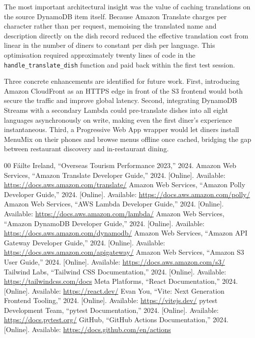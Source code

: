 \documentclass[conference]{IEEEtran}
\begin{document}
The most important architectural insight was the value of caching translations on the source DynamoDB item itself. Because Amazon Translate charges per character rather than per request, memoising the translated name and description directly on the dish record reduced the effective translation cost from linear in the number of diners to constant per dish per language. This optimisation required approximately twenty lines of code in the \texttt{handle\_translate\_dish} function and paid back within the first test session.

Three concrete enhancements are identified for future work. First, introducing Amazon CloudFront as an HTTPS edge in front of the S3 frontend would both secure the traffic and improve global latency. Second, integrating DynamoDB Streams with a secondary Lambda could pre-translate dishes into all eight languages asynchronously on write, making even the first diner's experience instantaneous. Third, a Progressive Web App wrapper would let diners install MenuMix on their phones and browse menus offline once cached, bridging the gap between restaurant discovery and in-restaurant dining.

\begin{thebibliography}{00}
 F\'ailte Ireland, ``Overseas Tourism Performance 2023,'' 2024.
 Amazon Web Services, ``Amazon Translate Developer Guide,'' 2024. [Online]. Available: \url{https://docs.aws.amazon.com/translate/}
 Amazon Web Services, ``Amazon Polly Developer Guide,'' 2024. [Online]. Available: \url{https://docs.aws.amazon.com/polly/}
 Amazon Web Services, ``AWS Lambda Developer Guide,'' 2024. [Online]. Available: \url{https://docs.aws.amazon.com/lambda/}
 Amazon Web Services, ``Amazon DynamoDB Developer Guide,'' 2024. [Online]. Available: \url{https://docs.aws.amazon.com/dynamodb/}
 Amazon Web Services, ``Amazon API Gateway Developer Guide,'' 2024. [Online]. Available: \url{https://docs.aws.amazon.com/apigateway/}
 Amazon Web Services, ``Amazon S3 User Guide,'' 2024. [Online]. Available: \url{https://docs.aws.amazon.com/s3/}
 Tailwind Labs, ``Tailwind CSS Documentation,'' 2024. [Online]. Available: \url{https://tailwindcss.com/docs}
 Meta Platforms, ``React Documentation,'' 2024. [Online]. Available: \url{https://react.dev/}
 Evan You, ``Vite: Next Generation Frontend Tooling,'' 2024. [Online]. Available: \url{https://vitejs.dev/}
 pytest Development Team, ``pytest Documentation,'' 2024. [Online]. Available: \url{https://docs.pytest.org/}
 GitHub, ``GitHub Actions Documentation,'' 2024. [Online]. Available: \url{https://docs.github.com/en/actions}
\end{thebibliography}
\end{document}
